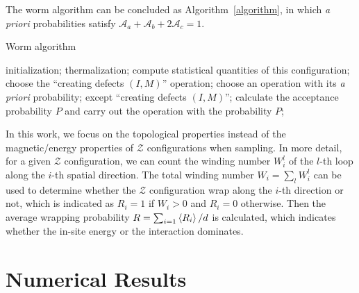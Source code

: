 \documentclass{article}
\theoremstyle{plain} \newtheorem{thm}{Theorem}[section]
\theoremstyle{definition} \newtheorem{df}{Definition}[section]
\theoremstyle{definition} \newtheorem{eg}{Example}
\theoremstyle{remark} \newtheorem*{rmk}{Remark}
\begin{document}
The worm algorithm can be concluded as Algorithm~\ref{algorithm}, in which \textit{a priori} probabilities satisfy $\mathcal{A}_a+\mathcal{A}_b+2\mathcal{A}_c = 1$.\\
\begin{minipage}{\linewidth}
  \begin{algorithm}[H]
  \caption{Worm algorithm}
  \label{algorithm}
  \begin{algorithmic}
    \STATE initialization;
    \STATE thermalization;
    \LOOP
        \STATE compute statistical quantities of this configuration;
        \STATE choose the ``creating defects $(I, M)$'' operation;
      \ELSE
        \STATE  choose an operation with its \textit{a priori}  probability;
        except ``creating defects $(I, M)$'';
      \ENDIF
      \STATE calculate the acceptance probability $P$ and carry out the operation with the probability $P$;
    \ENDLOOP
  \end{algorithmic}
\end{algorithm}
\end{minipage}
\vspace{3mm}

In this work, we focus on the topological properties instead of the magnetic/energy properties of $\mathcal{Z}$ configurations when sampling. In more detail, for a given $\mathcal{Z}$ configuration, we can count the winding number $W_i^l$ of the $l$-th loop along the $i$-th spatial direction. The total winding number $W_i = \sum_{l}W_i^l$ can be used to determine whether the $\mathcal{Z}$ configuration wrap along the $i$-th direction or not, which is indicated as $R_i = 1$ if $W_i > 0$ and $R_i = 0$ otherwise. Then the average wrapping probability $R = \sum_{i=1}\braket{R_i}/d$ is calculated, which indicates whether the in-site energy or the interaction dominates.
\section{Numerical Results}
\end{document}
